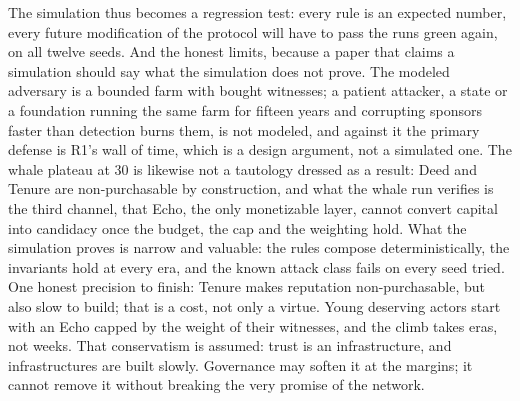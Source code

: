 The simulation thus becomes a regression test: every rule is an expected
number, every future modification of the protocol will have to pass the
runs green again, on all twelve seeds. And the honest limits, because a
paper that claims a simulation should say what the simulation does not
prove. The modeled adversary is a bounded farm with bought witnesses; a
patient attacker, a state or a foundation running the same farm for
fifteen years and corrupting sponsors faster than detection burns them,
is not modeled, and against it the primary defense is R1's wall of time,
which is a design argument, not a simulated one. The whale plateau at 30
is likewise not a tautology dressed as a result: Deed and Tenure are
non-purchasable by construction, and what the whale run verifies is the
third channel, that Echo, the only monetizable layer, cannot convert
capital into candidacy once the budget, the cap and the weighting hold.
What the simulation proves is narrow and valuable: the rules compose
deterministically, the invariants hold at every era, and the known
attack class fails on every seed tried. One honest precision to finish:
Tenure makes reputation non-purchasable, but also slow to build; that is
a cost, not only a virtue. Young deserving actors start with an Echo
capped by the weight of their witnesses, and the climb takes eras, not
weeks. That conservatism is assumed: trust is an infrastructure, and
infrastructures are built slowly. Governance may soften it at the
margins; it cannot remove it without breaking the very promise of the
network.
